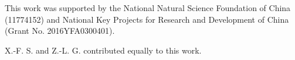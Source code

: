 \documentclass[amsmath,superscriptaddress,showpacs,aps,prb,twocolumn]{revtex4-1}
\begin{document}

\begin{acknowledgments}
\par This work was supported by the National Natural Science Foundation of China (11774152) and National Key Projects for Research and Development of China (Grant No. 2016YFA0300401).
\par X.-F. S. and Z.-L. G. contributed equally to this work.
\end{acknowledgments}


\end{document}
